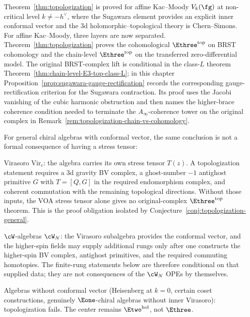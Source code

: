 \begin{remark}
\label{rem:topologization-scope}
Theorem~\ref{thm:topologization} is proved for affine
Kac--Moody $V_k(\fg)$ at non-critical level
$k \neq -h^\vee$, where the Sugawara element provides
an explicit inner conformal vector and the $3$d
holomorphic--topological theory is Chern--Simons.
For affine Kac--Moody, three layers are now separated.
Theorem~\ref{thm:topologization} proves the cohomological
$\Ethree^{\mathrm{top}}$ on BRST cohomology and the
chain-level $\Ethree^{\mathrm{top}}$ on the transferred
zero-differential model. The original BRST-complex lift is
conditional in the class-$L$ theorem
Theorem~\ref{thm:chain-level-E3-top-class-L}; in this chapter
Proposition~\ref{prop:sugawara-gauge-rectification} records
the corresponding gauge-rectification criterion for the
Sugawara contraction. Its proof uses the Jacobi vanishing of
the cubic harmonic obstruction and then names the higher-brace
coherence condition needed to terminate the
$A_\infty$-coherence tower on the original complex in
Remark~\ref{rem:topologization-chain-vs-cohomology}.

For general chiral algebras with conformal vector, the
same conclusion is not a formal consequence of having a
stress tensor:

Virasoro $\mathrm{Vir}_c$: the algebra carries its own
stress tensor $T(z)$. A topologization statement requires a
$3$d gravity BV complex, a ghost-number $-1$ antighost
primitive $G$ with $T=[Q,G]$ in the required endomorphism
complex, and coherent commutation with the remaining
topological directions. Without those inputs, the VOA
stress tensor alone gives no original-complex
$\Ethree^{\mathrm{top}}$ theorem. This is the proof
obligation isolated by
Conjecture~\ref{conj:topologization-general}.

$\cW$-algebras $\cW_N$: the Virasoro subalgebra provides
the conformal vector, and the higher-spin fields may supply
additional rungs only after one constructs the higher-spin
BV complex, antighost primitives, and the required commuting
homotopies. The finite-rung statements below are therefore
conditional on that supplied data; they are not consequences
of the $\cW_N$ OPEs by themselves.

Algebras without conformal vector (Heisenberg at $k = 0$,
certain coset constructions, genuinely $\Eone$-chiral
algebras without inner Virasoro): topologization fails.
The center remains $\Etwo^{\mathrm{hol}}$, not $\Ethree$.
\end{remark}

